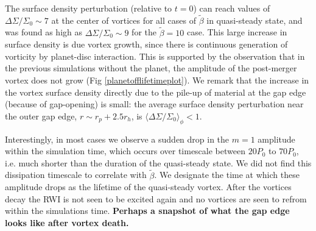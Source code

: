 The surface density perturbation (relative to $t=0$)  
can reach values of $\Delta\Sigma/\Sigma_0 \sim 7$ at the center of vortices
for all cases of $\tilde\beta$ in quasi-steady state, and
was found as high as $\Delta\Sigma/\Sigma_0 \sim 9$ for the 
$\tilde\beta=10$ case. This large increase in surface density is due 
vortex growth, since there is continuous generation of vorticity by
planet-disc interaction. This is supported by the observation that in
the previous simulations without the planet, the amplitude of
the post-merger vortex does not grow (Fig
\ref{planetofflifetimeplot}).  We remark that the increase in the
vortex surface density directly due to the pile-up of material at the
gap edge (because of gap-opening) is small: the average surface density
perturbation near the outer gap edge, $r\sim r_{p}+2.5r_h$, is 
$\langle\Delta\Sigma/\Sigma_0\rangle_\phi<1$.  



Interestingly, in most cases we observe a sudden drop in 
the $m=1$ amplitude within the simulation time, which occurs over
timescale between $20P_0$ to $70P_0$, i.e. much shorter than the duration of the
quasi-steady state. We did not find this dissipation timescale to
correlate with $\tilde\beta$. %
We designate the time at which these amplitude drops as the lifetime 
of the quasi-steady vortex. After the vortices decay the RWI is 
not seen to be excited again and no vortices are seen to refrom within the
simulations time. 
{\bf Perhaps a snapshot of what the gap edge looks like after vortex death.
}

